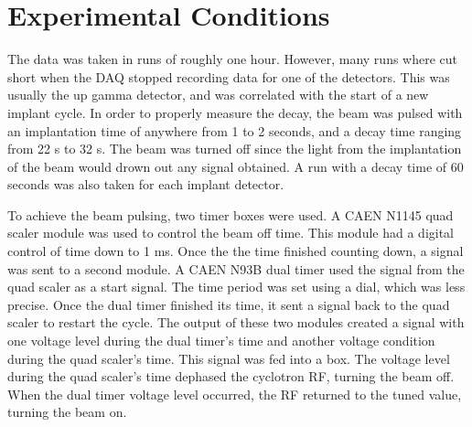 \documentclass[main.tex]{subfiles}
\begin{document}
\section{Experimental Conditions}
The data was taken in runs of roughly one hour. 
However, many runs where cut short when the DAQ stopped recording data for one of the detectors.
This was usually the up gamma detector, and was correlated with the start of a new implant cycle.
In order to properly measure the decay, the beam was pulsed with an implantation time of anywhere from 1 to 2 seconds, and a decay time ranging from 22 s to 32 s. 
The beam was turned off since the light from the implantation of the beam would drown out any signal obtained. 
A run with a decay time of 60 seconds was also taken for each implant detector. 

To achieve the beam pulsing, two timer boxes were used.
A CAEN N1145 quad scaler module was used to control the beam off time.
This module had a digital control of time down to 1 ms.
Once the the time finished counting down, a signal was sent to a second module. 
A CAEN N93B dual timer used the signal from the quad scaler as a start signal.
The time period was set using a dial, which was less precise. 
Once the dual timer finished its time, it sent a signal back to the quad scaler to restart the cycle.
The output of these two modules created a signal with one voltage level during the dual timer's time and another voltage condition during the quad scaler's time.
This signal was fed into a box.
The voltage level during the quad scaler's time dephased the cyclotron RF, turning the beam off.
When the dual timer voltage level occurred, the RF returned to the tuned value, turning the beam on.  
\end{document}
